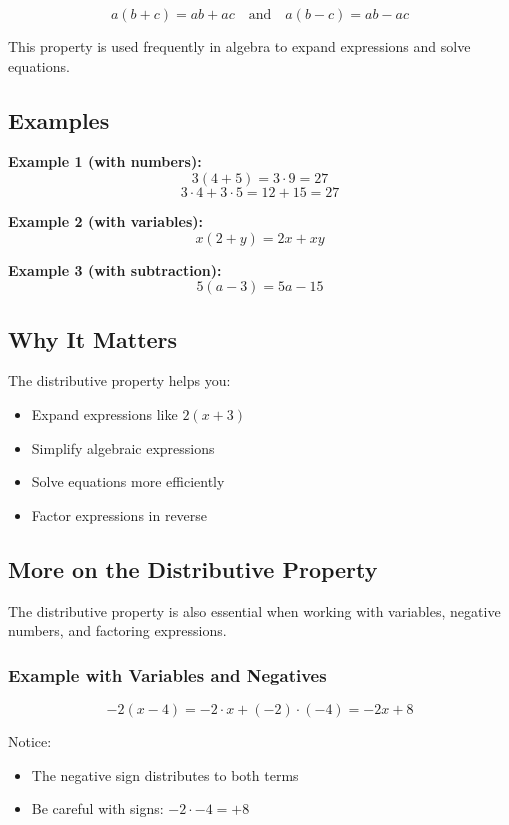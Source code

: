 \documentclass[11pt]{article}
\begin{document}
\[
a(b + c) = ab + ac
\quad \text{and} \quad
a(b - c) = ab - ac
\]

This property is used frequently in algebra to expand expressions and solve equations.

\subsection*{Examples}

\textbf{Example 1 (with numbers):}
\[
3(4 + 5) = 3 \cdot 9 = 27
\]
\[
3 \cdot 4 + 3 \cdot 5 = 12 + 15 = 27
\]

\textbf{Example 2 (with variables):}
\[
x(2 + y) = 2x + xy
\]

\textbf{Example 3 (with subtraction):}
\[
5(a - 3) = 5a - 15
\]

\subsection*{Why It Matters}

The distributive property helps you:
\begin{itemize}
  \item Expand expressions like \( 2(x + 3) \)
  \item Simplify algebraic expressions
  \item Solve equations more efficiently
  \item Factor expressions in reverse
\end{itemize}
\subsection*{More on the Distributive Property}

The distributive property is also essential when working with variables, negative numbers, and factoring expressions.

\subsubsection*{Example with Variables and Negatives}

\[
-2(x - 4) = -2 \cdot x + (-2) \cdot (-4) = -2x + 8
\]

Notice:
\begin{itemize}
  \item The negative sign distributes to both terms
  \item Be careful with signs: \( -2 \cdot -4 = +8 \)
\end{itemize}
\end{document}

